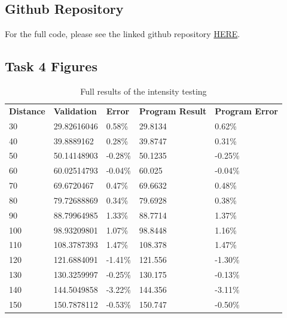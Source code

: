 \documentclass[conference]{IEEEtran}
\begin{document}
\printbibliography


\onecolumn
\subsection{Github Repository}

For the full code, please see the linked github repository \href{https://github.com/jjpendlebury/AINT308-Coursework}{HERE}.
\subsection{Task 4 Figures}\label{app:T4}
\begin{table}[H]
\caption{Full results of the intensity testing}
\label{tab:T4_full}
\begin{tabular}{lllll}
\textbf{Distance} & \textbf{Validation} & \textbf{Error} & \textbf{Program Result} & \textbf{Program Error} \\
30                & 29.82616046         & 0.58\%         & 29.8134                 & 0.62\%                 \\
40                & 39.8889162          & 0.28\%         & 39.8747                 & 0.31\%                 \\
50                & 50.14148903         & -0.28\%        & 50.1235                 & -0.25\%                \\
60                & 60.02514793         & -0.04\%        & 60.025                  & -0.04\%                \\
70                & 69.6720467          & 0.47\%         & 69.6632                 & 0.48\%                 \\
80                & 79.72688869         & 0.34\%         & 79.6928                 & 0.38\%                 \\
90                & 88.79964985         & 1.33\%         & 88.7714                 & 1.37\%                 \\
100               & 98.93209801         & 1.07\%         & 98.8448                 & 1.16\%                 \\
110               & 108.3787393         & 1.47\%         & 108.378                 & 1.47\%                 \\
120               & 121.6884091         & -1.41\%        & 121.556                 & -1.30\%                \\
130               & 130.3259997         & -0.25\%        & 130.175                 & -0.13\%                \\
140               & 144.5049858         & -3.22\%        & 144.356                 & -3.11\%                \\
150               & 150.7878112         & -0.53\%        & 150.747                 & -0.50\%               
\end{tabular}
\end{table}
\end{document}
